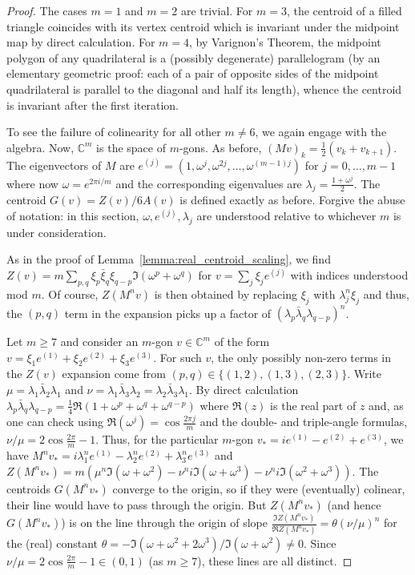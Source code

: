 \documentclass{amsart}
\newcommand*\C{\mathbb C}
\theoremstyle{definition}
\begin{document}
\begin{proof}
    The cases $m=1$ and $m=2$ are trivial. For $m=3$, the centroid of a filled triangle coincides with its vertex centroid which is invariant under the midpoint map by direct calculation. For $m=4$, by Varignon's Theorem, the midpoint polygon of any quadrilateral is a (possibly degenerate) parallelogram (by an elementary geometric proof: each of a pair of opposite sides of the midpoint quadrilateral is parallel to the diagonal and half its length), whence the centroid is invariant after the first iteration.

    To see the failure of colinearity for all other $m\ne6$, we again engage with the algebra. Now, $\C^m$ is the space of $m$-gons. As before, $(Mv)_k = \frac12(v_k+v_{k+1})$. The eigenvectors of $M$ are $e^{(j)} = (1,\omega^j,\omega^{2j},\dots,\omega^{(m-1)j})$ for $j=0,\dots,m-1$ where now $\omega = e^{2\pi i/m}$ and the corresponding eigenvalues are $\lambda_j = \frac{1+\omega^j}{2}$. The centroid $G(v) = Z(v)/6A(v)$ is defined exactly as before. Forgive the abuse of notation: in this section, $\omega, e^{(j)}, \lambda_j$ are understood relative to whichever $m$ is under consideration.

    As in the proof of Lemma~\ref{lemma:real_centroid_scaling}, we find $Z(v) = m\sum_{p,q}\xi_p\bar\xi_q\xi_{q-p}\Im(\omega^p+\omega^q)$ for $v = \sum_j\xi_je^{(j)}$ with indices understood mod $m$. Of course, $Z(M^nv)$ is then obtained by replacing $\xi_j$ with $\lambda_j^n\xi_j$ and thus, the $(p,q)$ term in the expansion picks up a factor of $(\lambda_p\bar\lambda_q\lambda_{q-p})^n$.

    Let $m\ge 7$ and consider an $m$-gon $v \in \C^m$ of the form $v = \xi_1e^{(1)}+\xi_2e^{(2)}+\xi_3e^{(3)}$. For such $v$, the only possibly non-zero terms in the $Z(v)$ expansion come from $(p,q) \in \{(1,2),(1,3),(2,3)\}$. Write $\mu=\lambda_1\bar\lambda_2\lambda_1$ and $\nu=\lambda_1\bar\lambda_3\lambda_2 = \lambda_2\bar\lambda_3\lambda_1$. By direct calculation $\lambda_p\bar\lambda_q\lambda_{q-p} = \frac14\Re(1+\omega^p+\omega^q+\omega^{q-p})$ where $\Re(z)$ is the real part of $z$ and, as one can check using $\Re(\omega^j)=\cos\frac{2\pi j}{m}$ and the double- and triple-angle formulas, $\nu/\mu = 2\cos\frac{2\pi}m-1$. Thus, for the particular $m$-gon $v_* = ie^{(1)} - e^{(2)}+e^{(3)}$, we have $M^nv_* = i\lambda_1^ne^{(1)} - \lambda_2^ne^{(2)} + \lambda_3^ne^{(3)}$ and $Z(M^nv_*) = m(\mu^n\Im(\omega+\omega^2) - \nu^ni\Im(\omega+\omega^3) - \nu^ni\Im(\omega^2+\omega^3))$. The centroids $G(M^nv_*)$ converge to the origin, so if they were (eventually) colinear, their line would have to pass through the origin. But $Z(M^nv_*)$ (and hence $G(M^nv_*)$) is on the line through the origin of slope $\frac{\Im Z(M^nv_*)}{\Re Z(M^nv_*)} = \theta(\nu/\mu)^n$ for the (real) constant $\theta = -\Im(\omega+\omega^2+2\omega^3)/\Im(\omega+\omega^2) \ne 0$. Since $\nu/\mu = 2\cos\frac{2\pi}{m}-1 \in (0,1)$ (as $m\ge 7$), these lines are all distinct.


\end{proof}
\end{document}

